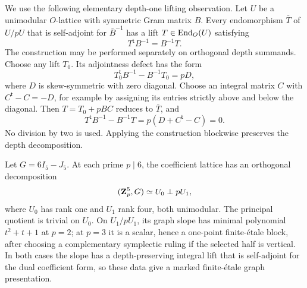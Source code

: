 We use the following elementary depth-one lifting observation.  Let \(U\) be
a unimodular \(O\)-lattice with symmetric Gram matrix \(B\).  Every
endomorphism \(\bar T\) of \(U/pU\) that is self-adjoint for
\(\bar B^{-1}\) has a lift \(T\in\operatorname{End}_O(U)\) satisfying
\[
 T^{\mathsf t}B^{-1}=B^{-1}T.
 \tag{3.11}
 \label{eq:depth-one-self-adjoint-lift}
\]
The construction may be performed separately on orthogonal depth summands.
Choose any lift \(T_0\).  Its adjointness defect has the form
\[
 T_0^{\mathsf t}B^{-1}-B^{-1}T_0=pD,
\]
where \(D\) is skew-symmetric with zero diagonal.  Choose an integral matrix
\(C\) with \(C^{\mathsf t}-C=-D\), for example by assigning its entries
strictly above and below the diagonal.  Then \(T=T_0+pBC\) reduces to
\(\bar T\), and
\[
 T^{\mathsf t}B^{-1}-B^{-1}T
 =p(D+C^{\mathsf t}-C)=0.
\]
No division by two is used.  Applying the construction blockwise preserves
the depth decomposition.

\begin{lemma}
\label{lem:six-axis-local-chart}
%
%
Let \(G=6I_5-J_5\).  At each prime \(p\mid6\), the coefficient lattice has
an orthogonal decomposition
\[
 (\mathbf Z_p^5,G)\simeq U_0\perp pU_1,
\]
where \(U_0\) has rank one and \(U_1\) rank four, both unimodular.  The
principal quotient is trivial on \(U_0\).  On \(U_1/pU_1\), its graph slope
has minimal polynomial \(t^2+t+1\) at \(p=2\); at \(p=3\) it is a scalar,
hence a one-point finite-\'etale block, after choosing a complementary
symplectic ruling if the selected half is vertical.  In both cases the slope has a
depth-preserving integral lift that is self-adjoint for the dual coefficient
form, so these data give a marked finite-\'etale graph presentation.
\end{lemma}

